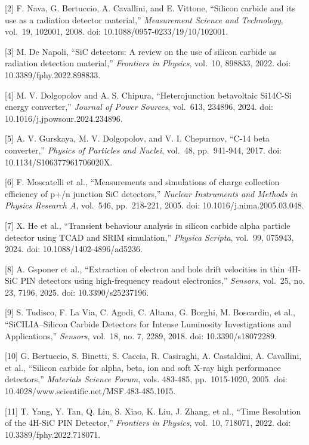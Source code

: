 \documentclass[
  10pt,
  a4paper,
]{article}
\begin{document}
{[}2{]} F. Nava, G. Bertuccio, A. Cavallini, and E. Vittone, ``Silicon
carbide and its use as a radiation detector material,''
\emph{Measurement Science and Technology}, vol.~19, 102001, 2008. doi:
10.1088/0957-0233/19/10/102001.

{[}3{]} M. De Napoli, ``SiC detectors: A review on the use of silicon
carbide as radiation detection material,'' \emph{Frontiers in Physics},
vol.~10, 898833, 2022. doi: 10.3389/fphy.2022.898833.

{[}4{]} M. V. Dolgopolov and A. S. Chipura, ``Heterojunction betavoltaic
Si14C-Si energy converter,'' \emph{Journal of Power Sources}, vol.~613,
234896, 2024. doi: 10.1016/j.jpowsour.2024.234896.

{[}5{]} A. V. Gurskaya, M. V. Dolgopolov, and V. I. Chepurnov, ``C-14
beta converter,'' \emph{Physics of Particles and Nuclei}, vol.~48,
pp.~941-944, 2017. doi: 10.1134/S106377961706020X.

{[}6{]} F. Moscatelli et al., ``Measurements and simulations of charge
collection efficiency of p+/n junction SiC detectors,'' \emph{Nuclear
Instruments and Methods in Physics Research A}, vol.~546, pp.~218-221,
2005. doi: 10.1016/j.nima.2005.03.048.

{[}7{]} X. He et al., ``Transient behaviour analysis in silicon carbide
alpha particle detector using TCAD and SRIM simulation,'' \emph{Physica
Scripta}, vol.~99, 075943, 2024. doi: 10.1088/1402-4896/ad5236.

{[}8{]} A. Gsponer et al., ``Extraction of electron and hole drift
velocities in thin 4H-SiC PIN detectors using high-frequency readout
electronics,'' \emph{Sensors}, vol.~25, no. 23, 7196, 2025. doi:
10.3390/s25237196.

{[}9{]} S. Tudisco, F. La Via, C. Agodi, C. Altana, G. Borghi, M.
Boscardin, et al., ``SiCILIA--Silicon Carbide Detectors for Intense
Luminosity Investigations and Applications,'' \emph{Sensors}, vol.~18,
no. 7, 2289, 2018. doi: 10.3390/s18072289.

{[}10{]} G. Bertuccio, S. Binetti, S. Caccia, R. Casiraghi, A.
Castaldini, A. Cavallini, et al., ``Silicon carbide for alpha, beta, ion
and soft X-ray high performance detectors,'' \emph{Materials Science
Forum}, vols. 483-485, pp.~1015-1020, 2005. doi:
10.4028/www.scientific.net/MSF.483-485.1015.

{[}11{]} T. Yang, Y. Tan, Q. Liu, S. Xiao, K. Liu, J. Zhang, et al.,
``Time Resolution of the 4H-SiC PIN Detector,'' \emph{Frontiers in
Physics}, vol.~10, 718071, 2022. doi: 10.3389/fphy.2022.718071.
\end{document}
